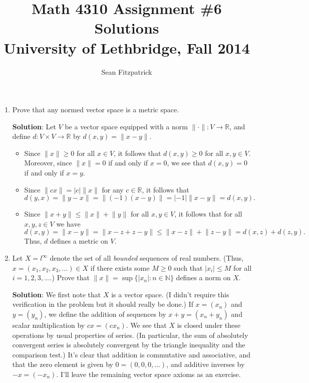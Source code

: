 \documentclass[letterpaper,12pt]{article}
\title{Math 4310 Assignment \#6 Solutions\\University of Lethbridge, Fall 2014}
\author{Sean Fitzpatrick}
\newcommand{\abs}[1]{\lvert #1\rvert}
\newcommand{\len}[1]{\lVert #1\rVert}
\newcommand{\R}{\mathbb{R}}
\newcommand{\N}{\mathbb{N}}
\begin{document}
 \maketitle

\begin{enumerate}
\item Prove that any normed vector space is a metric space.

\bigskip

{\bf Solution}: Let $V$ be a vector space equipped with a norm $\len{\cdot}:V\to\R$, and define $d:V\times V\to\R$ by $d(x,y)=\len{x-y}$.
\begin{itemize}
 \item Since $\len{x}\geq 0$ for all $x\in V$, it follows that $d(x,y)\geq 0$ for all $x,y\in V$. Moreover, since $\len{x}=0$ if and only if $x=0$, we see that $d(x,y)=0$ if and only if $x=y$.
 \item Since $\len{cx} = \abs{c}\len{x}$ for any $c\in\R$, it follows that 
\[
 d(y,x) = \len{y-x} = \len{(-1)(x-y)}=\abs{-1}\len{x-y}=d(x,y).
\]
 \item Since $\len{x+y}\leq \len{x}+\len{y}$ for all $x,y\in V$, it follows that for all $x,y,z\in V$ we have
\[
 d(x,y) = \len{x-y} = \len{x-z+z-y}\leq \len{x-z}+\len{z-y} = d(x,z)+d(z,y).
\]
Thus, $d$ defines a metric on $V$.
\end{itemize}


\item Let $X={l}^\infty$ denote the set of all {\em bounded} sequences of real numbers. (Thus, $x=(x_1,x_2,x_3,\ldots)\in X$ if there exists some $M\geq 0$ such that $\abs{x_i}\leq M$ for all $i=1,2,3,\ldots$.) Prove that $\len{x} = \sup\{\abs{x_n}:n\in\N\}$ defines a norm on $X$. 

\bigskip

{\bf Solution}: We first note that $X$ is a vector space. (I didn't require this verification in the problem but it should really be done.) If $x=(x_n)$ and $y=(y_n)$, we define the addition of sequences by $x+y = (x_n+y_n)$ and scalar multiplication by $cx = (cx_n)$. We see that $X$ is closed under these operations by usual properties of series. (In particular, the sum of absolutely convergent series is absolutely convergent by the triangle inequality and the comparison test.) It's clear that addition is commutative and associative, and that the zero element is given by $0=(0,0,0,\ldots)$, and additive inverses by $-x = (-x_n)$. I'll leave the remaining vector space axioms as an exercise.


\end{enumerate}
\end{document}
